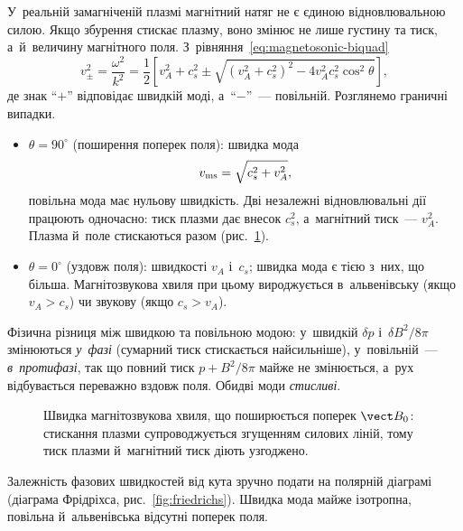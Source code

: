 У~реальній замагніченій плазмі магнітний натяг не є єдиною відновлювальною силою. Якщо
збурення стискає плазму, воно змінює не лише густину та тиск, а~й~величину магнітного
поля. З~рівняння~\eqref{eq:magnetosonic-biquad}
\begin{equation}
v_{\pm}^2=\frac{\omega^2}{k^2}
=\frac12\left[v_A^2+c_s^2\pm\sqrt{(v_A^2+c_s^2)^2-4v_A^2c_s^2\cos^2\theta}\right],
\label{eq:wave-magnetosonic-general}
\end{equation}
де знак \enquote{$+$} відповідає швидкій моді, а~\enquote{$-$}~--- повільній. Розглянемо граничні випадки.
\begin{itemize}
	\item $\theta=90^\circ$ (поширення поперек поля): швидка мода
	  \begin{equation}\label{eq:wave-magnetosonic-speed}
	  	v_{\rm ms}=\sqrt{c_s^2+v_A^2},
	  \end{equation}
	  повільна мода має нульову швидкість. Дві незалежні відновлювальні дії працюють
	  одночасно: тиск плазми дає внесок $c_s^2$, а~магнітний тиск~--- $v_A^2$. Плазма й~поле
	  стискаються разом (рис.~\ref{fig:magnetosonic-wave}).
	\item $\theta=0^\circ$ (уздовж поля): швидкості $v_A$ і~$c_s$; швидка мода є тією з~них,
	  що більша. Магнітозвукова хвиля при цьому вироджується в~альвенівську (якщо $v_A>c_s$) чи
	  звукову (якщо $c_s>v_A$).
\end{itemize}
Фізична різниця між швидкою та повільною модою: у~швидкій $\delta p$ і~$\delta B^2/8\pi$
змінюються \emph{у~фазі} (сумарний тиск стискається найсильніше), у~повільній~---
\emph{в~протифазі}, так що повний тиск $p+B^2/8\pi$ майже не змінюється, а~рух відбувається
переважно вздовж поля. Обидві моди \emph{стисливі}.

\begin{figure}[ht]
\centering
{}
\caption{Швидка магнітозвукова хвиля, що поширюється поперек $\vect B_0$: стискання
плазми супроводжується згущенням силових ліній, тому тиск плазми й~магнітний тиск
діють узгоджено.}
\label{fig:magnetosonic-wave}
\end{figure}

Залежність фазових швидкостей від кута зручно подати на полярній діаграмі
(діаграма Фрідріхса, рис.~\ref{fig:friedrichs}). Швидка мода майже ізотропна, повільна
й~альвенівська відсутні поперек поля.

